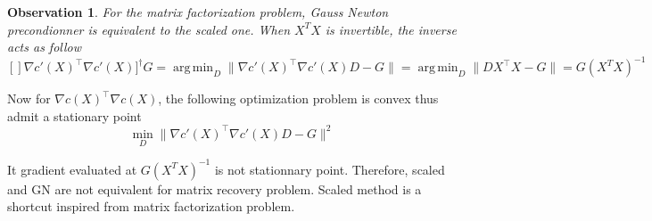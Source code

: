 \documentclass{article}
\newtheorem{observation}{Observation}
\DeclareMathOperator*{\argmin}{arg\,min}
\begin{document}
\begin{observation}
For the matrix factorization problem, Gauss Newton precondionner is equivalent to the scaled one. When $X^TX$ is invertible, the inverse acts as follow
$$
[] \nabla c'(X)^\top \nabla c'(X) ]^{\dagger} G = \argmin_{D} \| \nabla c'(X)^\top \nabla c'(X) D - G \| = \argmin_{D} \| DX^\top X - G \|  = G(X^TX)^{-1}
$$
\end{observation}

Now for $\nabla c(X)^\top \nabla c(X)$, the following optimization problem is convex thus admit a stationary point 
$$
\min_{D} \| \nabla c'(X)^\top \nabla c'(X) D - G \|^2
$$

It gradient evaluated at $G(X^TX)^{-1}$ is not stationnary point. Therefore, scaled and  GN are not equivalent for matrix recovery problem. Scaled method is a shortcut inspired from matrix factorization problem.



\end{document}
